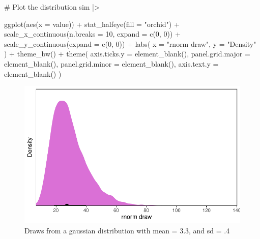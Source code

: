 \documentclass[
  letterpaper,
  DIV=11,
  numbers=noendperiod]{scrreprt}
\newenvironment{Shaded}{\begin{snugshade}}{\end{snugshade}}
\newcommand{\AttributeTok}[1]{\textcolor[rgb]{0.40,0.45,0.13}{#1}}
\newcommand{\CommentTok}[1]{\textcolor[rgb]{0.37,0.37,0.37}{#1}}
\newcommand{\DecValTok}[1]{\textcolor[rgb]{0.68,0.00,0.00}{#1}}
\newcommand{\FunctionTok}[1]{\textcolor[rgb]{0.28,0.35,0.67}{#1}}
\newcommand{\NormalTok}[1]{\textcolor[rgb]{0.00,0.23,0.31}{#1}}
\newcommand{\SpecialCharTok}[1]{\textcolor[rgb]{0.37,0.37,0.37}{#1}}
\newcommand{\StringTok}[1]{\textcolor[rgb]{0.13,0.47,0.30}{#1}}
\begin{document}
\begin{Shaded}
\begin{Highlighting}[]
\CommentTok{\# Plot the distribution}
\NormalTok{sim }\SpecialCharTok{|\textgreater{}}

    \FunctionTok{ggplot}\NormalTok{(}\FunctionTok{aes}\NormalTok{(}\AttributeTok{x =}\NormalTok{ value)) }\SpecialCharTok{+}
    \FunctionTok{stat\_halfeye}\NormalTok{(}\AttributeTok{fill =} \StringTok{"orchid"}\NormalTok{) }\SpecialCharTok{+}
    \FunctionTok{scale\_x\_continuous}\NormalTok{(}\AttributeTok{n.breaks =} \DecValTok{10}\NormalTok{, }\AttributeTok{expand =} \FunctionTok{c}\NormalTok{(}\DecValTok{0}\NormalTok{, }\DecValTok{0}\NormalTok{)) }\SpecialCharTok{+}
    \FunctionTok{scale\_y\_continuous}\NormalTok{(}\AttributeTok{expand =} \FunctionTok{c}\NormalTok{(}\DecValTok{0}\NormalTok{, }\DecValTok{0}\NormalTok{)) }\SpecialCharTok{+}
    \FunctionTok{labs}\NormalTok{(}
      \AttributeTok{x =} \StringTok{"rnorm draw"}\NormalTok{,}
      \AttributeTok{y =} \StringTok{"Density"}
\NormalTok{    ) }\SpecialCharTok{+}
    \FunctionTok{theme\_bw}\NormalTok{() }\SpecialCharTok{+}
    \FunctionTok{theme}\NormalTok{(}
      \AttributeTok{axis.ticks.y =} \FunctionTok{element\_blank}\NormalTok{(),}
      \AttributeTok{panel.grid.major =} \FunctionTok{element\_blank}\NormalTok{(),}
      \AttributeTok{panel.grid.minor =} \FunctionTok{element\_blank}\NormalTok{(),}
      \AttributeTok{axis.text.y =} \FunctionTok{element\_blank}\NormalTok{()}
\NormalTok{    )}
\end{Highlighting}
\end{Shaded}

\begin{figure}[H]

{\centering \includegraphics{./bayesian-cfa_files/figure-pdf/prior-pred-weibull-intercept-1.pdf}

}

\caption{Draws from a gaussian distribution with mean = 3.3, and sd =
.4}

\end{figure}
\end{document}
